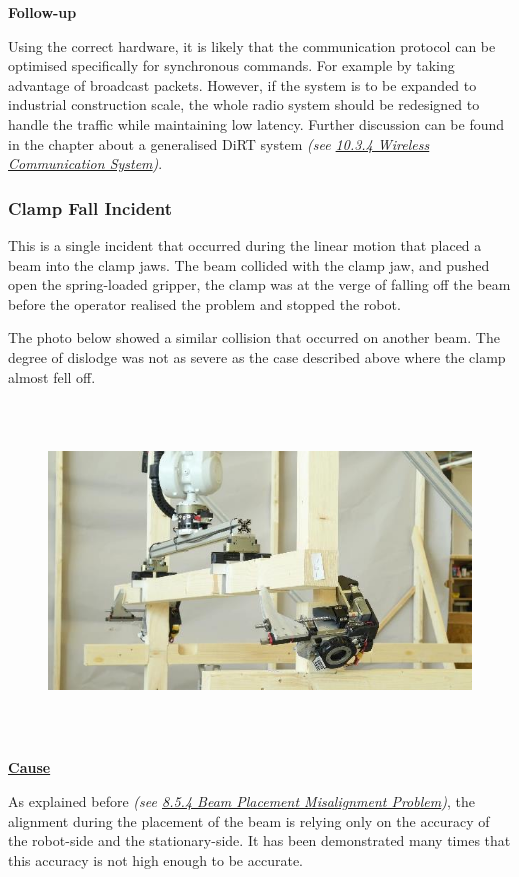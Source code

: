 \documentclass[11pt]{book}
\begin{document}
\textbf{Follow-up}

Using the correct hardware, it is likely that the communication protocol can be optimised specifically for synchronous commands. For example by taking advantage of broadcast packets. However, if the system is to be expanded to industrial construction scale, the whole radio system should be redesigned to handle the traffic while maintaining low latency. Further discussion can be found in the chapter about a generalised DiRT system \textit{(see \uline{10.3.4 Wireless Communication System})}. 

\subsubsection{Clamp Fall Incident}

This is a single incident that occurred during the linear motion that placed a beam into the clamp jaws. The beam collided with the clamp jaw, and pushed open the spring-loaded gripper, the clamp was at the verge of falling off the beam before the operator realised the problem and stopped the robot.

The photo below showed a similar collision that occurred on another beam. The degree of dislodge was not as severe as the case described above where the clamp almost fell off.

\begin{figure}[H]
\includegraphics[width=15.92cm,height=8.96cm]{./images/image40.jpeg}
\end{figure}


\textbf{\uline{Cause}}

As explained before \textit{(see \uline{8.5.4 Beam Placement Misalignment Problem})}, the alignment during the placement of the beam is relying only on the accuracy of the robot-side and the stationary-side. It has been demonstrated many times that this accuracy is not high enough to be accurate. 
\end{document}
